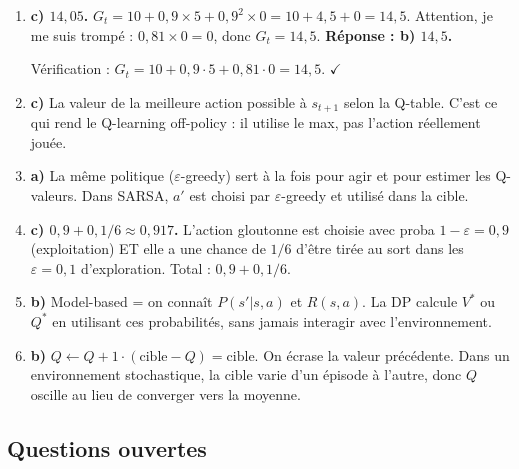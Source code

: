 \documentclass[11pt,a4paper]{article}
\begin{document}
\begin{enumerate}
\item \textbf{c) $14{,}05$.} $G_t = 10 + 0{,}9 \times 5 + 0{,}9^2 \times 0 = 10 + 4{,}5 + 0 = 14{,}5$. Attention, je me suis trompé : $0{,}81 \times 0 = 0$, donc $G_t = 14{,}5$. \textbf{Réponse : b) $14{,}5$.}

Vérification : $G_t = 10 + 0{,}9 \cdot 5 + 0{,}81 \cdot 0 = 14{,}5$. $\checkmark$

\item \textbf{c)} La valeur de la meilleure action possible à $s_{t+1}$ selon la Q-table. C'est ce qui rend le Q-learning off-policy : il utilise le max, pas l'action réellement jouée.

\item \textbf{a)} La même politique ($\varepsilon$-greedy) sert à la fois pour agir et pour estimer les Q-valeurs. Dans SARSA, $a'$ est choisi par $\varepsilon$-greedy et utilisé dans la cible.

\item \textbf{c) $0{,}9 + 0{,}1/6 \approx 0{,}917$.} L'action gloutonne est choisie avec proba $1 - \varepsilon = 0{,}9$ (exploitation) ET elle a une chance de $1/6$ d'être tirée au sort dans les $\varepsilon = 0{,}1$ d'exploration. Total : $0{,}9 + 0{,}1/6$.

\item \textbf{b)} Model-based = on connaît $P(s'|s,a)$ et $R(s,a)$. La DP calcule $V^*$ ou $Q^*$ en utilisant ces probabilités, sans jamais interagir avec l'environnement.

\item \textbf{b)} $Q \leftarrow Q + 1 \cdot (\text{cible} - Q) = \text{cible}$. On écrase la valeur précédente. Dans un environnement stochastique, la cible varie d'un épisode à l'autre, donc $Q$ oscille au lieu de converger vers la moyenne.
\end{enumerate}

\subsection{Questions ouvertes}
\end{document}
